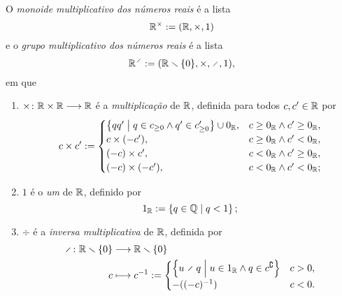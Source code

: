 \begin{definition}
O \emph{monoide multiplicativo dos números reais} é a lista
	\begin{equation*}
	\mathbb{R}^\times := (\mathbb{R},\times,1)
	\end{equation*}
e o \emph{grupo multiplicativo dos números reais} é a lista
	\begin{equation*}
	\R^{\div}:= (\R \setminus \{0\},\times,\div,1),
	\end{equation*}
em que
	\begin{enumerate}
	\item ${\times}\colon {\mathbb{R}\times \mathbb{R}} \longrightarrow {\mathbb{R}}$ é a \emph{multiplicação} de $\mathbb{R}$, definida para todos $c, c' \in \mathbb{R}$ por
		\begin{equation*}
		c \times c' :=
			\begin{cases}
			\left\{{qq'}\;\middle\vert\;{q \in c_{\geq 0} \land q' \in c'_{\geq 0}}\right\} \cup 0_{\mathbb{R}},	& c \geq 0_{\mathbb{R}} \land c' \geq 0_{\mathbb{R}}, \\
			c \times (-c'),			& c \geq 0_{\mathbb{R}} \land c' < 0_{\mathbb{R}}, \\
			(-c) \times c',			& c < 0_{\mathbb{R}} \land c' \geq 0_{\mathbb{R}}, \\
			(-c) \times (-c'),		& c < 0_{\mathbb{R}} \land c' < 0_{\mathbb{R}};
			\end{cases}
		\end{equation*}

\item $1$ é o \emph{um} de $\mathbb{R}$, definido por
		\begin{equation*}
		1_{\mathbb{R}} := \left\{{q \in \mathbb{Q}}\;\middle\vert\;{q < 1}\right\};
		\end{equation*}
	\item $\div$ é a \emph{inversa multiplicativa} de $\mathbb{R}$, definida por
		\begin{align*}
		\func{\div}{\R \setminus \{0\}}{\R \setminus \{0\}}{c}{
			c\inv :=
			\begin{cases}
			\set{u \div q}{u \in 1_{\R} \land q \in c^\complement}	& c > 0, \\
			-((-c)\inv)	& c < 0.
			\end{cases}
		}
		\end{align*}
	\end{enumerate}
\end{definition}

